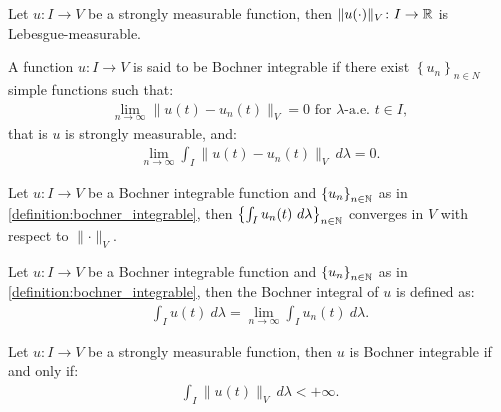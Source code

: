 \begin{lemma}
    Let $u\colon I \rightarrow V$ be a strongly measurable function, then $\lVert u(\cdot) \rVert_V \colon I \rightarrow \mathbb{R}$ is Lebesgue-measurable.
\end{lemma}

\begin{definition} \label{definition:bochner_integrable}
    A function $u\colon I \rightarrow V$ is said to be Bochner integrable if there exist $\left\{ u_n \right\}_{n \in N}$ simple functions such that:
    \begin{gather}
        \lim_{n \rightarrow \infty} \lVert u(t) - u_n(t) \rVert_V = 0 \text{ for } \lambda \text{-a.e. } t \in I,
    \end{gather}
    that is  $u$ is strongly measurable, and:
    \begin{gather}
        \lim_{n \rightarrow \infty} \int_I \lVert u(t) - u_n(t) \rVert_V ~ d \lambda = 0.
    \end{gather}
\end{definition}

\begin{lemma}
    Let $u\colon I \rightarrow V$ be a Bochner integrable function and $\left\{ u_n \right\}_{n \in \mathbb{N}}$ as in \ref{definition:bochner_integrable}, then $\left\{ \int_I u_n(t) ~ d \lambda \right\}_{n \in \mathbb{N}}$ converges in $V$ with respect to $\lVert \cdot \rVert_V$.
\end{lemma}

\begin{definition}
    Let $u\colon I \rightarrow V$ be a Bochner integrable function and $\left\{ u_n \right\}_{n \in \mathbb{N}}$ as in \ref{definition:bochner_integrable}, then the Bochner integral of $u$ is defined as:
    \begin{gather}
        \int_I u(t) ~ d \lambda = \lim_{n \rightarrow \infty} \int_I u_n(t) ~ d \lambda.
    \end{gather}
\end{definition}

\begin{theorem}[Bochner]
    Let $u\colon I \rightarrow V$ be a strongly measurable function, then $u$ is Bochner integrable if and only if:
    \begin{gather}
        \int_I \lVert u(t) \rVert_V ~ d \lambda < + \infty.
    \end{gather}
\end{theorem}

